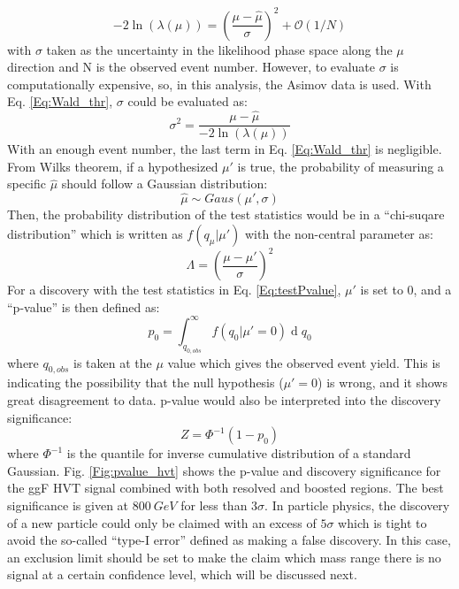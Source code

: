 \begin{equation}
\label{Eq:Wald_thr}
-2\ln(\lambda(\mu))=(\frac{\mu-\hat{\mu}}{\sigma})^2+\mathcal{O}(1/N)
\end{equation}
with $\sigma$ taken as the uncertainty in the likelihood phase space along the $\mu$ direction and N is the observed event number. However, to evaluate $\sigma$ is computationally expensive, so, in this analysis, the Asimov data is used. With Eq. \ref{Eq:Wald_thr}, $\sigma$ could be evaluated as:
\begin{equation}
\sigma^2 = \frac{\mu-\hat{\mu}}{-2\ln(\lambda(\mu))}
\end{equation}
With an enough event number, the last term in Eq. \ref{Eq:Wald_thr} is negligible. From Wilks theorem, if a hypothesized $\mu'$ is true, the probability of measuring a specific $\hat{\mu}$ should follow a Gaussian distribution:
\begin{equation}
\hat{\mu}\sim Gaus(\mu',\sigma)
\end{equation}
Then, the probability distribution of the test statistics would be in a ``chi-suqare distribution'' which is written as $f(q_{\mu}|\mu')$ with the non-central parameter as:
\begin{equation}
\Lambda=(\frac{\mu-\mu'}{\sigma})^2
\end{equation}
For a discovery with the test statistics in Eq. \ref{Eq:testPvalue}, $\mu'$ is set to 0, and a ``p-value'' is then defined as:
\begin{equation}
p_{0}=\int_{q_{0,obs}}^{\infty}f(q_{0}|\mu'=0)\operatorname{d}q_{0}
\end{equation}	 
where $q_{0,obs}$ is taken at the $\mu$ value which gives the observed event yield. This is indicating the possibility that the null hypothesis ($\mu'=0$) is wrong, and it shows great disagreement to data. p-value would also be interpreted into the discovery significance:
\begin{equation}
Z=\Phi^{-1}(1-p_{0})
\end{equation}
where $\Phi^{-1}$ is the quantile for inverse cumulative distribution of a standard Gaussian. Fig. \ref{Fig:pvalue_hvt} shows the p-value and discovery significance for the ggF HVT signal combined with both resolved and boosted regions. The best significance is given at $800~GeV$ for less than $3\sigma$. In particle physics, the discovery of a new particle could only be claimed with an excess of $5\sigma$ which is tight to avoid the so-called ``type-I error'' defined as making a false discovery. In this case, an exclusion limit should be set to make the claim which mass range there is no signal at a certain confidence level, which will be discussed next. 
